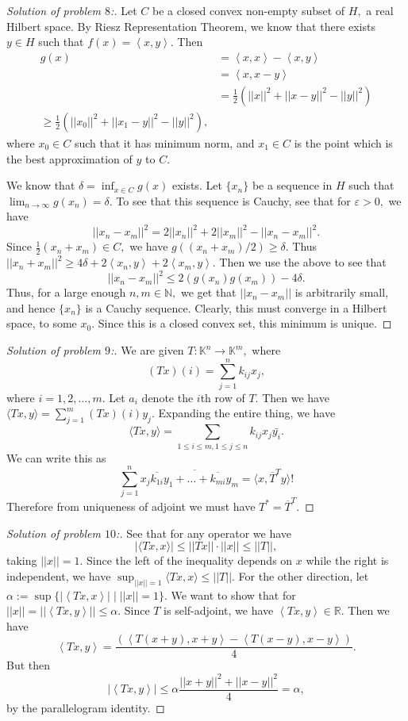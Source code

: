\documentclass[letterpaper,11pt,twoside]{article}
\theoremstyle{proposition}
\theoremstyle{definition}
\theoremstyle{theorem}
\theoremstyle{definition}
\theoremstyle{definition}
\theoremstyle{definition}
\theoremstyle{lemma}
\theoremstyle{definition}
\theoremstyle{definition}
\theoremstyle{corollary}
\theoremstyle{definition}
\theoremstyle{definition}
\theoremstyle{definition}
\newcommand{\N}{\mathbb{N}}
\newcommand{\R}{\mathbb{R}}
\newcommand{\abs}[1]{\left \vert #1 \right \vert}
\newcommand{\norm}[1]{\left \vert \left \vert #1 \right \vert \right \vert}
\newcommand{\gen}[1]{\left\langle #1\right\rangle}
\renewcommand{\div}{\;\vert\;}
\begin{document}
\begin{proof}[Solution of problem $8$:]
Let $C$ be a closed convex non-empty subset of $H,$ a real Hilbert space. By Riesz Representation Theorem, we know that there exists $y \in H$ such that 
$f(x)= \gen{x,y}.$ 
	Then \begin{align*}
		g(x) &= \gen{x,x} - \gen{x,y}\\
		&= \gen{x,x-y}\\
		&= \frac{1}{2} (\norm{x}^2+ \norm{x-y}^2 - \norm{y}^2)\\
		\geq  \frac{1}{2} (\norm{x_0}^2+ \norm{x_1-y}^2 - \norm{y}^2),
	\end{align*} 
where $x_0 \in C$ such that it has minimum norm, and $x_1 \in C$ is the point which is the best approximation of $y$ to $C.$

We know that $\delta= \inf_{x \in C} g(x)$ exists. Let $\{x_n\}$ be a sequence in $H$ such that $\lim_{n \to \infty}g(x_n)=\delta. $
To see that this sequence is Cauchy, see that for $\varepsilon > 0,$ we have $$\norm{x_n-x_m}^2=2 \norm{x_n}^2+2 \norm{x_m}^2- \norm{x_n-x_m}^2 .$$
Since $\frac{1}{2}(x_n+x_m) \in C,$ we have $g((x_n+x_m)/2) \geq \delta. $
Thus $\norm{x_n+x_m}^2 \geq 4\delta + 2\gen{x_n,y}+2\gen{x_m,y}.$
Then we use the above to see that $$\norm{x_n-x_m}^2 \leq 2(g(x_n)g(x_m))-4\delta.$$
Thus, for a large enough $n,m \in \N,$ we get that $\norm{x_n-x_m}$ is arbitrarily small, and hence $\{x_n\}$ is a Cauchy sequence. 
Clearly, this must converge in a Hilbert space, to some $x_0.$ Since this is a closed convex set, this minimum is unique. 
\end{proof}
\begin{proof}[Solution of problem $9$:]
	We are given $T: \mathbb{K}^n \to \mathbb{K}^m,$ where $$(Tx)(i)=\sum_{j=1}^{n}k_{ij}x_j,$$
	where $i=1,2,\dots,m.$ Let $a_i$ denote the $i$th row of $T.$ Then we have $\langle Tx,y \rangle= \sum_{j=1}^m (Tx)(i)y_j.$
	Expanding the entire thing, we have $$ \langle Tx,y\rangle= \sum_{1 \leq i \leq m, 1 \leq j \leq n} k_{ij}x_j \bar{y_i}.$$ We can write this as 
	$$\sum_{j=1}^n x_j \overline{\overline{k_{1i}}y_1 + \dots + \overline{k_{mi}}y_m} = \langle x, \overline{T}^{T}y \rangle!$$ Therefore from uniqueness of 
	adjoint we must have $T^{*}= \overline{T}^{T}.$

\end{proof}
\begin{proof}[Solution of problem $10$:]
		See that for any operator we have $$|\langle Tx,x\rangle| \leq ||Tx|| \cdot ||x|| \leq ||T||,$$
	taking $||x|| =1.$ Since the left of the inequality depends on $x$ while the right is independent, we have $\sup_{||x||=1}\langle Tx,x\rangle \leq 
	||T||.$
	For the other direction, let $\alpha := \sup\{\abs{\gen{Tx,x}} \div \norm{x}=1\}.$ We want to show that for $\norm{x}=\norm{\gen{Tx,y}} \leq \alpha.$	
	Since $T$ is self-adjoint, we have $\gen{Tx,y} \in \R.$ Then we have 
	$$\gen{Tx,y}= \frac{\left( \gen{T(x+y),x+y} - \gen{T(x-y),x-y} \right)}{4}.$$
	But then $$\abs{\gen{Tx,y}} \leq \alpha \frac{\norm{x+y}^2+\norm{x-y}^2}{4}= \alpha,$$
	by the parallelogram identity. 
\end{proof}
\end{document}

